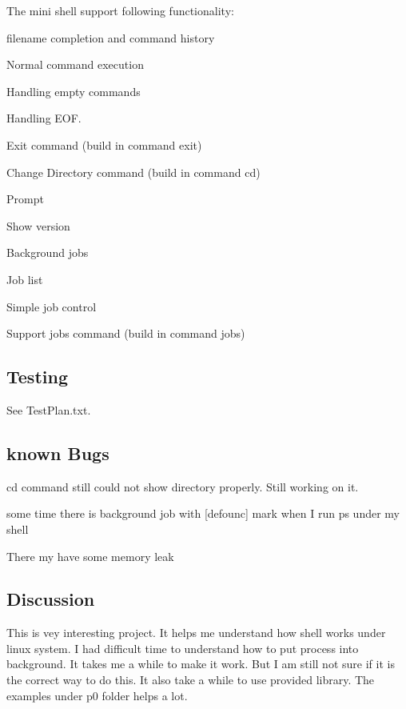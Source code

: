 The mini shell support following functionality\+:
\begin{DoxyEnumerate}
\item filename completion and command history
\item Normal command execution
\item Handling empty commands
\item Handling E\+OF.
\item Exit command (build in command \textquotesingle{}exit\textquotesingle{})
\item Change Directory command (build in command \textquotesingle{}cd\textquotesingle{})
\item Prompt
\item Show version
\item Background jobs
\item Job list
\item Simple job control
\item Support \textquotesingle{}jobs\textquotesingle{} command (build in command \textquotesingle{}jobs\textquotesingle{})
\end{DoxyEnumerate}

\subsection*{Testing}

See Test\+Plan.\+txt.

\subsection*{known Bugs}


\begin{DoxyEnumerate}
\item cd command still could not show directory properly. Still working on it.
\item some time there is background job with \mbox{[}defounc\mbox{]} mark when I run ps under my shell
\item There my have some memory leak
\end{DoxyEnumerate}

\subsection*{Discussion}

This is vey interesting project. It helps me understand how shell works under linux system. I had difficult time to understand how to put process into background. It takes me a while to make it work. But I am still not sure if it is the correct way to do this. It also take a while to use provided library. The examples under p0 folder helps a lot.

